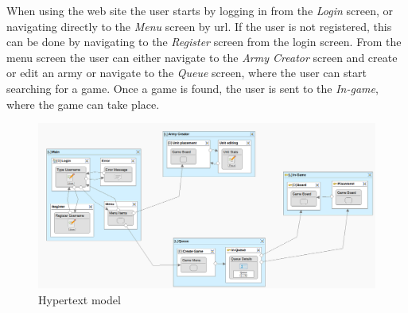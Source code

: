 \documentclass{article}
\begin{document}
When using the web site the user starts by logging in from the \textit{Login} screen, or navigating directly to the \textit{Menu} screen by url. If the user is not registered, this can be done by navigating to the \textit{Register} screen from the login screen. From the menu screen the user can either navigate to the \textit{Army Creator} screen and create or edit an army or navigate to the \textit{Queue} screen, where the user can start searching for a game. Once a game is found, the user is sent to the \textit{In-game}, where the game can take place.

\begin{figure}[H]
    \centering
    \includegraphics[width=\textwidth]{hypertext-model.png}
    \caption{Hypertext model}
    \label{fig:hypertext-model}
\end{figure}
\end{document}

